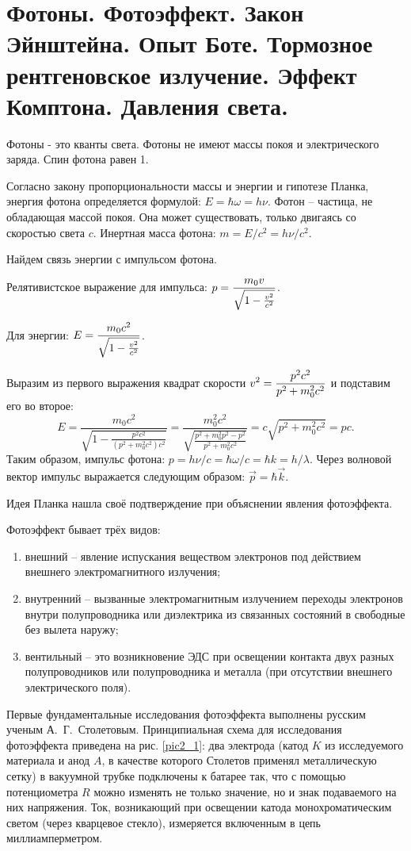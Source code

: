 \chapter{Фотоны. Фотоэффект. Закон Эйнштейна. Опыт Боте. Тормозное 
рентгеновское излучение. Эффект Комптона. Давления света.}

Фотоны - это кванты света. Фотоны не имеют массы покоя и электрического заряда.
Спин фотона равен 1.

Согласно закону пропорциональности массы и энергии и гипотезе Планка, энергия
фотона определяется формулой: \( E = \hbar\omega = h\nu \). Фотон -- частица, не
обладающая массой покоя. Она может существовать, только двигаясь со скоростью
света \( c \). Инертная масса фотона: \( m = E/c^2 = h\nu/c^2 \).

Найдем связь энергии с импульсом фотона.

Релятивистское выражение для импульса: \( \displaystyle p = \frac{m_0v}{\sqrt{1 -
\frac{v^2}{c^2}}} \).

Для энергии: \( \displaystyle E = \frac{m_0c^2}{\sqrt{1 - \frac{v^2}{c^2}}} \).

Выразим из первого выражения квадрат скорости \( \displaystyle v^2 = \frac{p^2c^2}{p^2 +
m_0^2c^2} \) и подставим его во второе:
\[
    E = \frac{m_0c^2}{\sqrt{1 - \frac{p^2c^2}{(p^2 + m_0^2c^2)c^2}}} =
    \frac{m_0^2c^2}{\sqrt{\frac{p^2 + m_0^2p^2 - p^2}{p^2 + m_0^2c^2}}} =
    c\sqrt{p^2 + m_0^2c^2} = pc.
\]
Таким образом, импульс фотона: \( p = h\nu/c = \hbar\omega/c = \hbar k =
h/\lambda \). Через волновой вектор импульс выражается следующим образом:
\( \vec{p} = \hbar\vec{k} \).

Идея Планка нашла своё подтверждение при объяснении явления фотоэффекта.

Фотоэффект бывает трёх видов:
\begin{enumerate}
    \item внешний -- явление испускания веществом электронов под действием
    внешнего электромагнитного излучения;
    \item внутренний -- вызванные электромагнитным излучением переходы
    электронов внутри полупроводника или диэлектрика из связанных состояний в
    свободные без вылета наружу;
    \item вентильный -- это возникновение ЭДС при освещении контакта двух разных
    полупроводников или полупроводника и металла (при отсутствии внешнего
    электрического поля).
\end{enumerate}

Первые фундаментальные исследования фотоэффекта выполнены русским ученым
А.~Г.~Столетовым. Принципиальная схема для исследования фотоэффекта приведена на
рис. \ref{pic2_1}: два электрода (катод \( K \) из исследуемого материала и
анод \( A \), в качестве которого Столетов применял металлическую сетку) в
вакуумной трубке подключены к батарее так, что с помощью потенциометра \( R \)
можно изменять не только значение, но и знак подаваемого на них напряжения. Ток,
возникающий при освещении катода монохроматическим светом (через кварцевое
стекло), измеряется включенным в цепь миллиамперметром.

